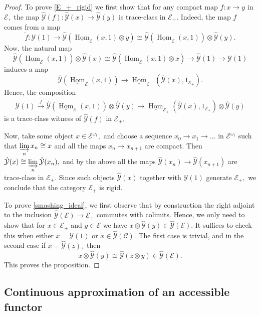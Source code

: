 \documentclass[11pt,leqno]{amsart}
\numberwithin{equation}{section}
\def\wt{\widetilde}
\def\Hom{\operatorname{Hom}}
\newcommand{\indlim}[1][]{\mathop{\varinjlim}\limits_{#1}}
\newcommand{\xto}{\xrightarrow}
\newcommand{\cC}{{\mathcal C}}
\newcommand{\cE}{{\mathcal E}}
\newcommand{\cY}{{\mathcal Y}}
\newcommand{\un}{\underline}
\begin{document}
\begin{proof} To prove \ref{E_+_rigid} we first show that for any compact map $f:x\to y$ in $\cE,$ the map $\hat{\cY}(f):\hat{\cY}(x)\to\hat{\cY}(y)$ is trace-class in $\cE_+.$ Indeed, the map $f$ comes from a map
	\begin{equation*}
		\wt{f}:\cY(1)\to\hat{\cY}(\un{\Hom}_{\cE}(x,1)\otimes y)\cong \hat{\cY}(\un{\Hom}_{\cE}(x,1))\otimes\hat{\cY}(y).
	\end{equation*}
	Now, the natural map
	\begin{equation*}
		\hat{\cY}(\un{\Hom}_{\cE}(x,1))\otimes\hat{\cY}(x)\cong \hat{\cY}(\un{\Hom}_{\cE}(x,1)\otimes x)\to \hat{\cY}(1)\to \cY(1)
	\end{equation*}
	induces a map
	\begin{equation*}
		\hat{\cY}(\un{\Hom}_{\cE}(x,1))\to\un{\Hom}_{\cE_+}(\hat{\cY}(x),1_{\cE_+}).
	\end{equation*}
	Hence, the composition
	\begin{equation*}
		\cY(1)\xto{\wt{f}} \hat{\cY}(\un{\Hom}_{\cE}(x,1))\otimes\hat{\cY}(y)\to \un{\Hom}_{\cE_+}(\hat{\cY}(x),1_{\cE_+})\otimes\hat{\cY}(y)
	\end{equation*}
	is a trace-class witness of $\hat{\cY}(f)$ in $\cE_+.$
	
	Now, take some object $x\in\cE^{\omega_1},$ and choose a sequence $x_0\to x_1\to\dots$ in $\cE^{\omega_1}$ such that $\indlim[n] x_n\cong x$ and all the maps $x_n\to x_{n+1}$ are compact. Then $\hat{\cY}(x)\cong \indlim[n]\hat{\cY}(x_n),$ and by the above all the maps $\hat{\cY}(x_n)\to\hat{\cY}(x_{n+1})$ are trace-class in $\cE_+.$
	Since such objects $\hat{\cY}(x)$ together with $\cY(1)$ generate $\cE_+,$ we conclude that the category $\cE_+$ is rigid.
	
	To prove \ref{smashing_ideal}, we first observe that by construction the right adjoint to the inclusion $\hat{\cY}(\cE)\to\cE_+$ commutes with colimits. Hence, we only need to show that for $x\in\cE_+$ and $y\in\cE$ we have $x\otimes\hat{\cY}(y)\in\hat{\cY}(\cE).$ It suffices to check this when either $x=\cY(1)$ or $x\in\hat{\cY}(\cC).$ The first case is trivial, and in the second case if $x=\hat{\cY}(z),$ then
	\begin{equation*}
		x\otimes\hat{\cY}(y)\cong \hat{\cY}(z\otimes y)\in \hat{\cY}(\cE).
	\end{equation*} This proves the proposition.
\end{proof}

\subsection{Continuous approximation of an accessible functor}
\end{document}
